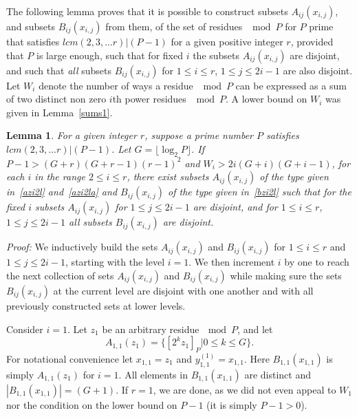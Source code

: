 \documentclass[12pt]{article} \pagestyle{plain} \topmargin
\newtheorem{lemma}{Lemma}
\begin{document}
The following lemma proves that it is possible to construct subsets
$A_{ij}(x_{i,j})$, and subsets $B_{ij}(x_{i,j})$ from them, of the
set of residues $\mod P$ for $P$ prime that satisfies $lcm(2,3,...r)
| (P-1)$ for a given positive integer $r$, provided that $P$ is
large enough, such that for fixed $i$ the subsets $A_{ij}(x_{i,j})$
are disjoint, and such that \emph{all} subsets $B_{ij}(x_{i,j})$ for
$1 \leq i \leq r$, $1 \leq j \leq 2i-1$ are also disjoint. Let $W_i$
denote the number of ways a residue $\mod P$ can be expressed as a
sum of two distinct non zero $i$th power residues $\mod P$. A lower
bound on $W_i$ was given in Lemma~\ref{sums1}.
\begin{lemma}\label{lemmaw} For a given integer $r$, suppose a prime number $P$ satisfies $lcm(2,3,...r) |
(P-1)$. Let $G =\lfloor \log_2{P}\rfloor$. If $P-1 >
(G+r)(G+r-1)(r-1)^2$ and $W_i
> 2i(G+i)(G+i-1)$, for each $i$ in the range $2 \leq i \leq
r$, there exist subsets $A_{ij}(x_{i,j})$ of the type given
in~\eqref{azi2l} and~\eqref{azi2la} and $B_{ij}(x_{i,j})$ of the
type given in~\eqref{bzi2l}
 such that for the fixed $i$ subsets $A_{ij}(x_{i,j})$ for $1 \leq j \leq 2i-1$ are disjoint, and
for $1 \leq i \leq r$, $1 \leq j \leq 2i-1$ all subsets
$B_{ij}(x_{i,j})$ are disjoint.
\end{lemma}
\noindent \textit{Proof:} We inductively build the sets
$A_{ij}(x_{i,j})$ and $B_{ij}(x_{i,j})$ for $1 \leq i \leq r$ and $1
\leq j \leq 2i-1$, starting with the level $i=1$. We then increment
$i$ by one to reach the next collection of sets $A_{ij}(x_{i,j})$
and $B_{ij}(x_{i,j})$ while making sure the sets $B_{ij}(x_{i,j})$
at the current level are disjoint with one another and with all
previously constructed sets at lower levels.

Consider $i=1$. Let $z_1$ be an arbitrary residue$~\mod P$, and let
\[A_{1,1}(z_1)=\{[2^{k}z_1]_P | 0 \leq k \leq G \}.\] For notational
convenience let $x_{1,1}=z_1$ and $y_{1,1}^{(1)}=x_{1,1}$. Here
$B_{1,1}(x_{1,1})$ is simply $A_{1,1}(z_1)$ for $i=1$. All elements
in $B_{1,1}(x_{1,1})$ are distinct and $|B_{1,1}(x_{1,1})| =(G+1)$.
If $r=1$, we are done, as we did not even appeal to $W_1$ nor the
condition on the lower bound on $P-1$ (it is simply $P-1>0$).
\end{document}
